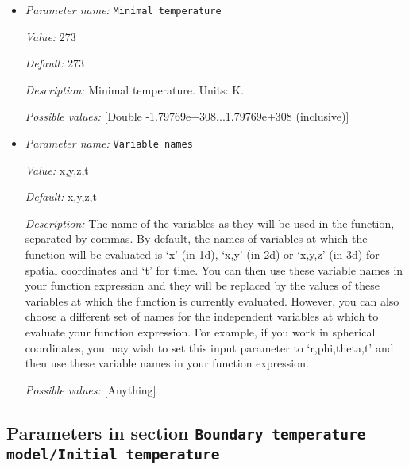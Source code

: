 \begin{itemize}
{\it Value:} 3773


{\it Default:} 3773


{\it Description:} Maximal temperature. Units: K.


{\it Possible values:} [Double -1.79769e+308...1.79769e+308 (inclusive)]
\item {\it Parameter name:} {\tt Minimal temperature}
\label{parameters:Boundary temperature model/Function/Minimal temperature}


{\it Value:} 273


{\it Default:} 273


{\it Description:} Minimal temperature. Units: K.


{\it Possible values:} [Double -1.79769e+308...1.79769e+308 (inclusive)]
\item {\it Parameter name:} {\tt Variable names}
\label{parameters:Boundary temperature model/Function/Variable names}


{\it Value:} x,y,z,t


{\it Default:} x,y,z,t


{\it Description:} The name of the variables as they will be used in the function, separated by commas. By default, the names of variables at which the function will be evaluated is `x' (in 1d), `x,y' (in 2d) or `x,y,z' (in 3d) for spatial coordinates and `t' for time. You can then use these variable names in your function expression and they will be replaced by the values of these variables at which the function is currently evaluated. However, you can also choose a different set of names for the independent variables at which to evaluate your function expression. For example, if you work in spherical coordinates, you may wish to set this input parameter to `r,phi,theta,t' and then use these variable names in your function expression.


{\it Possible values:} [Anything]
\end{itemize}

\subsection{Parameters in section \tt Boundary temperature model/Initial temperature}
\label{parameters:Boundary_20temperature_20model/Initial_20temperature}

